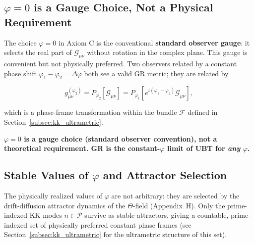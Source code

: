 \subsection{$\varphi = 0$ is a Gauge Choice, Not a Physical Requirement}

The choice $\varphi = 0$ in Axiom C is the conventional \textbf{standard observer gauge}: it selects
the real part of $\mathcal{G}_{\mu\nu}$ without rotation in the complex plane.  This gauge is
convenient but not physically preferred.  Two observers related by a constant phase shift
$\varphi_1 - \varphi_2 = \Delta\varphi$ both see a valid GR metric; they are related by

\begin{equation}
g_{\mu\nu}^{(\varphi_2)} = P_{\varphi_2}[\mathcal{G}_{\mu\nu}]
= P_{\varphi_1}\!\left[e^{i(\varphi_1-\varphi_2)}\mathcal{G}_{\mu\nu}\right],
\end{equation}

which is a phase-frame transformation within the bundle $\mathcal{F}$ defined in
Section~\ref{subsec:kk_ultrametric}.

\begin{tcolorbox}[colback=orange!5!white,colframe=orange!75!black,title=Canonical Statement]
\textbf{$\varphi = 0$ is a gauge choice (standard observer convention), not a theoretical requirement.
GR is the constant-$\varphi$ limit of UBT for \emph{any} $\varphi$.}
\end{tcolorbox}

\subsection{Stable Values of $\varphi$ and Attractor Selection}

The physically realized values of $\varphi$ are not arbitrary: they are selected by the
drift-diffusion attractor dynamics of the $\Theta$-field (Appendix~H).  Only the prime-indexed
KK modes $n \in \mathcal{P}$ survive as stable attractors, giving a countable, prime-indexed set of
physically preferred constant phase frames (see Section~\ref{subsec:kk_ultrametric} for the
ultrametric structure of this set).

